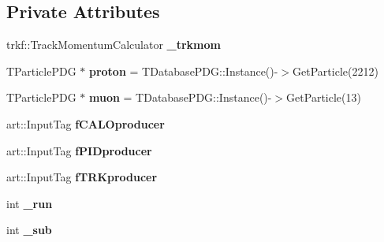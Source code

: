 \subsection*{Private Attributes}
\begin{DoxyCompactItemize}
\item 
trkf\+::\+Track\+Momentum\+Calculator {\bfseries \+\_\+trkmom}\hypertarget{classanalysis_1_1TrackAnalysis_aa69136b70c77e0f034fe009b86ba591b}{}\label{classanalysis_1_1TrackAnalysis_aa69136b70c77e0f034fe009b86ba591b}

\item 
T\+Particle\+P\+DG $\ast$ {\bfseries proton} = T\+Database\+P\+D\+G\+::\+Instance()-\/$>$Get\+Particle(2212)\hypertarget{classanalysis_1_1TrackAnalysis_a4adc7f89c334ab93747a8d4c4abbcc6d}{}\label{classanalysis_1_1TrackAnalysis_a4adc7f89c334ab93747a8d4c4abbcc6d}

\item 
T\+Particle\+P\+DG $\ast$ {\bfseries muon} = T\+Database\+P\+D\+G\+::\+Instance()-\/$>$Get\+Particle(13)\hypertarget{classanalysis_1_1TrackAnalysis_a0fe3b9e7864aaaa36b5f52826b4e3eb9}{}\label{classanalysis_1_1TrackAnalysis_a0fe3b9e7864aaaa36b5f52826b4e3eb9}

\item 
art\+::\+Input\+Tag {\bfseries f\+C\+A\+L\+Oproducer}\hypertarget{classanalysis_1_1TrackAnalysis_a0ceaf940b041eda0237cc73cd330d18d}{}\label{classanalysis_1_1TrackAnalysis_a0ceaf940b041eda0237cc73cd330d18d}

\item 
art\+::\+Input\+Tag {\bfseries f\+P\+I\+Dproducer}\hypertarget{classanalysis_1_1TrackAnalysis_a349dc117e508190c619cd9f47ea7647e}{}\label{classanalysis_1_1TrackAnalysis_a349dc117e508190c619cd9f47ea7647e}

\item 
art\+::\+Input\+Tag {\bfseries f\+T\+R\+Kproducer}\hypertarget{classanalysis_1_1TrackAnalysis_a45abdcf3140e68a2ce90501e33a00eb3}{}\label{classanalysis_1_1TrackAnalysis_a45abdcf3140e68a2ce90501e33a00eb3}

\item 
int {\bfseries \+\_\+run}\hypertarget{classanalysis_1_1TrackAnalysis_aa9a9d585543f931ac8b736f39a7dc4a5}{}\label{classanalysis_1_1TrackAnalysis_aa9a9d585543f931ac8b736f39a7dc4a5}

\item 
int {\bfseries \+\_\+sub}\hypertarget{classanalysis_1_1TrackAnalysis_ab85c46d9a61e56c9390814196ac18ab6}{}\label{classanalysis_1_1TrackAnalysis_ab85c46d9a61e56c9390814196ac18ab6}


\end{DoxyCompactItemize}
